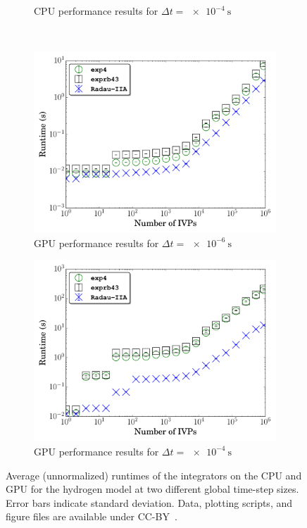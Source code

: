 \documentclass[11pt]{scrartcl}
\begin{document}
\begin{figure}[htbp]
\begin{subfigure}{0.49\textwidth}
      \caption{CPU performance results for $\Delta t = \SI{e-4}{\second}$}
  \end{subfigure}\\
  \begin{subfigure}{0.49\textwidth}
      \includegraphics[width=\linewidth]{H2_1e-06_gpu_nonorm.pdf}
      \caption{GPU performance results for $\Delta t = \SI{e-6}{\second}$}
  \end{subfigure}
  \begin{subfigure}{0.49\textwidth}
      \includegraphics[width=\linewidth]{H2_1e-04_gpu_nonorm.pdf}
      \caption{GPU performance results for $\Delta t = \SI{e-4}{\second}$}
  \end{subfigure}
  \caption{Average (unnormalized) runtimes of the integrators on the CPU and GPU for the hydrogen model at two different global time-step sizes.
  Error bars indicate standard deviation.
  Data, plotting scripts, and figure files are available under CC-BY~\cite{paperscript:2017}.}
  \label{F:raw_perf_H2CO}
\end{figure}
\end{document}
